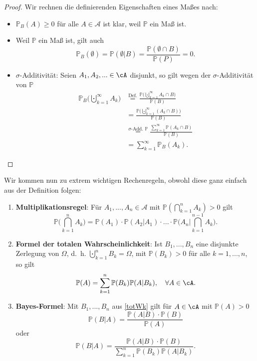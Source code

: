 \begin{proof}
	Wir rechnen die definierenden Eigenschaften eines Ma\ss es nach:
	\begin{itemize}
		\item $\mathbb P_B(A) \geq 0$ f\"ur alle $A\in \mathcal A$ ist klar, weil $\mathbb P$ ein Ma\ss{} ist.
		\item Weil $\mathbb P$ ein Ma\ss{} ist, gilt auch 
		\[ \mathbb{P}_B(\emptyset) = \mathbb{P}(\emptyset|B) = \frac{\mathbb{P}(\emptyset \cap B)}{\mathbb{P}(P)} = 0. \]
		\item $\sigma$-Additivität: Seien $A_1,A_2,... \in \cA$ disjunkt, so gilt wegen der $\sigma$-Additivit\"at von $\mathbb P$
		\begin{align*}
			\mathbb{P}_B\Big(\bigcupdot_{k=1}^{\infty} A_k \Big)& \overset{\text{Def.}}{=} \frac{\mathbb{P}\Big(\bigcupdot_{k=1}^{\infty} A_k \cap B\Big)}{\mathbb{P}(B)}\\
			&= \frac{\mathbb{P}\Big(\bigcupdot_{k=1}^{\infty} (A_k \cap B) \Big)}{\mathbb{P}(B)} \\
			&\overset{\sigma\text{-Add. }\mathbb{P}}{=} \frac{\sum\limits_{k=1}^{\infty} \mathbb{P}(A_k \cap B)}{\mathbb{P}(B)}\\
			& = \sum\limits_{k=1}^{\infty} \mathbb{P}_B(A_k).
		\end{align*}
	\end{itemize}
\end{proof}
Wir kommen nun zu extrem wichtigen Rechenregeln, obwohl diese ganz einfach aus der Definition folgen:
\begin{satz}\abs
	\begin{enumerate}[label=(\roman*)]
		\item \label{multipl} \textbf{Multiplikationsregel}: Für $A_1,...,A_n\in \mathcal A$ mit $\mathbb{P}(\bigcap_{k=1}^{n} A_k) > 0$ gilt
		\[ \mathbb{P}\Big(\bigcap_{k=1}^{n} A_k\Big) = \mathbb{P}(A_1)\cdot \mathbb{P}(A_2|A_1)\cdot ... \cdot \mathbb{P}\Big(A_n\Big|\bigcap_{k=1}^{n-1} A_k\Big). \]
		\item \label{totWk} \textbf{Formel der totalen Wahrscheinlichkeit}: Ist $B_1,...,B_n$ eine disjunkte Zerlegung von $\Omega$, \mbox{d. h.}  $\bigcupdot_{k=1}^{n} B_k = \Omega$, mit $\mathbb P(B_k)>0$ f\"ur alle $k=1,...,n$, so gilt 
		\[ \mathbb{P}(A) = \sum\limits_{k=1}^{n} \mathbb{P}(B_k)\mathbb{P}(A|B_k), \quad \forall A \in \cA. \]
		\item \label{bayes} \textbf{Bayes-Formel}: Mit $B_1,...,B_n$ aus \ref{totWk} gilt für $A \in \cA$ mit $\mathbb{P}(A) > 0$ \[ \mathbb{P}(B|A) = \frac{\mathbb{P}(A|B) \cdot \mathbb{P}(B)}{\mathbb{P}(A)} \] oder \[ \mathbb{P}(B|A) = \frac{\mathbb{P}(A|B) \cdot \mathbb{P}(B)}{\sum\limits_{k=1}^{n} \mathbb{P}(B_k) \mathbb{P}(A | B_k)}. \]
	\end{enumerate}
\end{satz}

